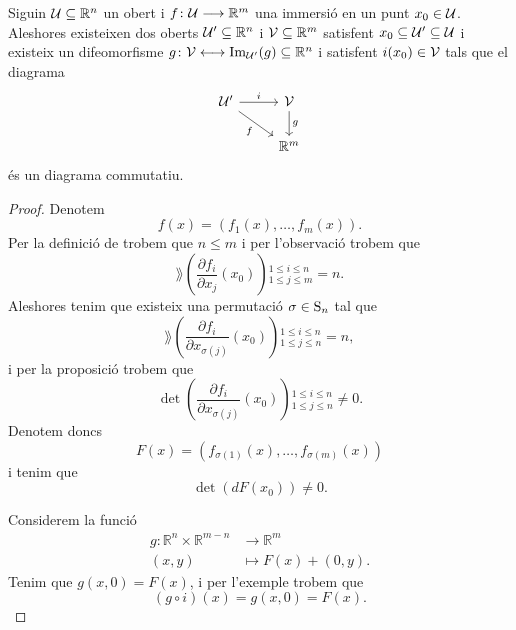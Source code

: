 \documentclass[../Apunts.tex]{subfiles}
\begin{document}
	\begin{theorem}
		\label{thm:Teorema d'estructura local de les immersions}
		Siguin \(\mathcal{U}\subseteq\mathbb{R}^{n}\) un obert i \(f\colon\mathcal{U}\longrightarrow\mathbb{R}^{m}\) una immersió en un punt \(x_{0}\in\mathcal{U}\). Aleshores existeixen dos oberts \(\mathcal{U}'\subseteq\mathbb{R}^{n}\) i \(\mathcal{V}\subseteq\mathbb{R}^{m}\) satisfent \(x_{0}\subseteq\mathcal{U}'\subseteq\mathcal{U}\) i existeix un difeomorfisme \(g\colon\mathcal{V}\longleftrightarrow\operatorname{Im}_{\mathcal{U}'}(g)\subseteq\mathbb{R}^{n}\) i satisfent \(i(x_{0})\in\mathcal{V}\) tals que el diagrama
		\[\begin{tikzcd}
			\obert{U}' \arrow{r}{i} \arrow[swap]{dr}{f} & \obert{V} \arrow{d}{g} \\
			& \mathbb{R}^{m}
		\end{tikzcd}\]
		és un diagrama commutatiu.
		\begin{proof}
			Denotem
			\[f(x)=(f_{1}(x),\dots,f_{m}(x)).\]
			Per la definició de  trobem que \(n\leq m\) i per l'observació  trobem que
			\[\rang\left(\frac{\partial f_{i}}{\partial x_{j}}(x_{0})\right){}_{1\leq j\leq m}^{1\leq i\leq n}=n.\]
			Aleshores tenim que existeix una permutació \(\sigma\in\operatorname{S}_{n}\) tal que
			\[\rang\left(\frac{\partial f_{i}}{\partial x_{\sigma(j)}}(x_{0})\right){}_{1\leq j\leq n}^{1\leq i\leq n}=n,\]
			i per la proposició  trobem que
			\[\det\left(\frac{\partial f_{i}}{\partial x_{\sigma(j)}}(x_{0})\right){}_{1\leq j\leq n}^{1\leq i\leq n}\neq0.\]
			Denotem doncs
			\[F(x)=(f_{\sigma(1)}(x),\dots,f_{\sigma(m)}(x))\]
			i tenim que
			\begin{equation}
				\label{thm:Teorema d'estructura local de les immersions:eq:1}
				\det(dF(x_{0}))\neq0.
			\end{equation}
			
			Considerem la funció
			\begin{align*}
				g\colon\mathbb{R}^{n}\times\mathbb{R}^{m-n}&\longrightarrow\mathbb{R}^{m} \\
				(x,y)&\longmapsto F(x)+(0,y).
			\end{align*}
			Tenim que \(g(x,0)=F(x)\), i per l'exemple  trobem que
			\[(g\circ i)(x)=g(x,0)=F(x).\]
			

\end{proof}
\end{theorem}
\end{document}
